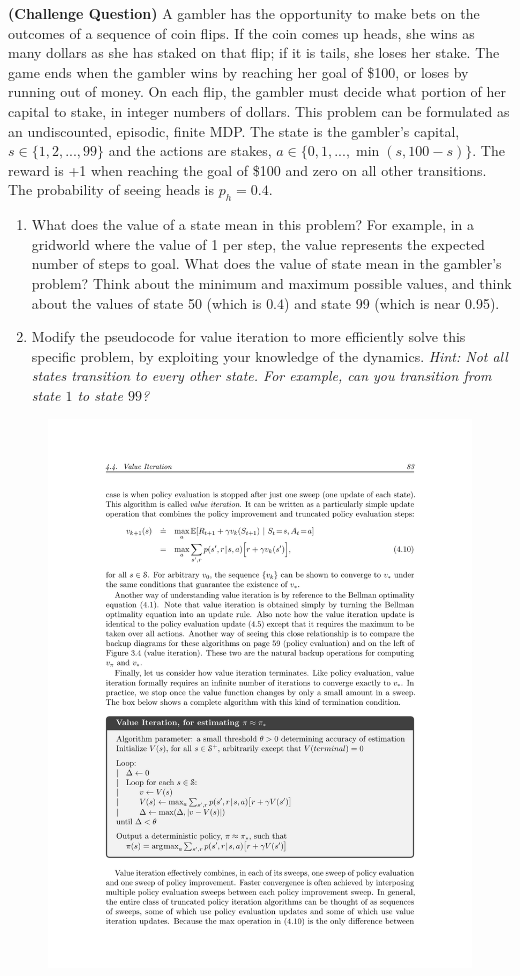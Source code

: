 \textbf{(Challenge Question)} A gambler has the opportunity to make bets on
the outcomes of a sequence of coin flips. If the coin comes up heads, she wins as many
dollars as she has staked on that flip; if it is tails, she loses her stake. The game ends
when the gambler wins by reaching her goal of \$100, or loses by running out of money.
On each flip, the gambler must decide what portion of her capital to stake, in integer
numbers of dollars. This problem can be formulated as an undiscounted, episodic, finite
MDP. The state is the gambler's capital, $s \in \{1, 2,..., 99\}$ and the actions
are stakes, $a \in \{0, 1,..., \min(s, 100-s) \}$.
The reward is +1 when reaching the goal of \$100 and zero on all other transitions. The probability of seeing heads is $p_h = 0.4$. 
%
\begin{enumerate}
  \item What does the value of a state mean in this problem? For example, in a gridworld where the value of 1 per step, the value represents the expected number of steps to goal. What does the value of state mean in the gambler's problem? Think about the minimum and maximum possible values, and think about the values of state 50 (which is $0.4$) and state 99 (which is near 0.95).
  \item Modify the pseudocode for value iteration to more efficiently solve this specific problem, by exploiting your knowledge of the dynamics. \textit{Hint: Not all states transition to every other state. For example, can you transition from state $1$ to state $99$?}  

\end{enumerate}
\begin{figure}[h!]
\centering
\includegraphics[scale=0.9]{figures/pseudocode_vi.pdf}
\end{figure}

